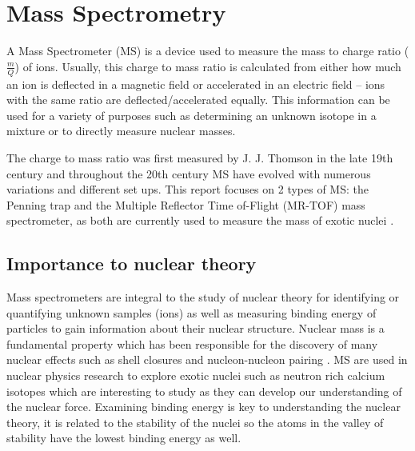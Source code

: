 \section{Mass Spectrometry}
A Mass Spectrometer (MS) is a device used to measure the mass to charge ratio ($\frac{m}{Q}$) of ions.
Usually, this charge to mass ratio is calculated from either how much an ion is deflected in a magnetic field or accelerated in an electric field – ions with the same ratio are deflected/accelerated equally.
This information can be used for a variety of purposes such as determining an unknown isotope in a mixture or to directly measure nuclear masses.

The charge to mass ratio was first measured by J. J. Thomson in the late 19th century \cite{noauthor_j_nodate} and throughout the 20th century MS have evolved with numerous variations and different set ups.
This report focuses on 2 types of MS: the Penning trap and the Multiple Reflector Time of-Flight (MR-TOF) mass spectrometer, as both are currently used to measure the mass of exotic nuclei \cite{famiano_nuclear_2019}.

\subsection{Importance to nuclear theory}
Mass spectrometers are integral to the study of nuclear theory for identifying or quantifying unknown samples (ions) as well as measuring binding energy of particles to gain information about their nuclear structure.
Nuclear mass is a fundamental property which has been responsible for the discovery of many nuclear effects such as shell closures and nucleon-nucleon pairing \cite{blaum_precision_2012}.
MS are used in nuclear physics research to explore exotic nuclei such as neutron rich calcium isotopes \cite{wienholtz_masses_2013} which are interesting to study as they can develop our understanding of the nuclear force.
Examining binding energy is key to understanding the nuclear theory, it is related to the stability of the nuclei so the atoms in the valley of stability have the lowest binding energy as well.

